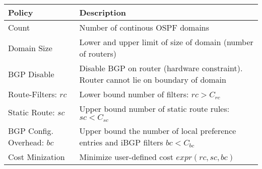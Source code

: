 \begin{table}[!t]
\begin{small}
	\begin{center}
		\begin{tabular}{m{6.5em}  m{17.7em} } 
			{\bf Policy} & {\bf Description} \\ 
			\hline
			Count & Number of continous OSPF domains  \\ \hline
			Domain Size  & Lower and upper
			limit of size of domain (number of routers) \\ \hline
			BGP \newline Disable & Disable BGP on router (hardware constraint). 
			Router cannot lie on boundary of domain \\ \hline
			Route-Filters: $rc$ & Lower bound number of filters:
			$rc > C_{rc}$\\ \hline
			Static Route: ${sc}$ & Upper bound number of static route rules: $sc < C_{sc}$ \\ \hline
			BGP Config. Overhead: $bc$ & Upper bound the number of local preference entries and iBGP filters $bc < C_{bc}$ \\ \hline
			Cost Minization & Minimize user-defined cost $expr(rc, sc, bc)$
		\end{tabular}
	\end{center}
	 \label{tab:configpolicysupport} 
\end{small}
\end{table}
